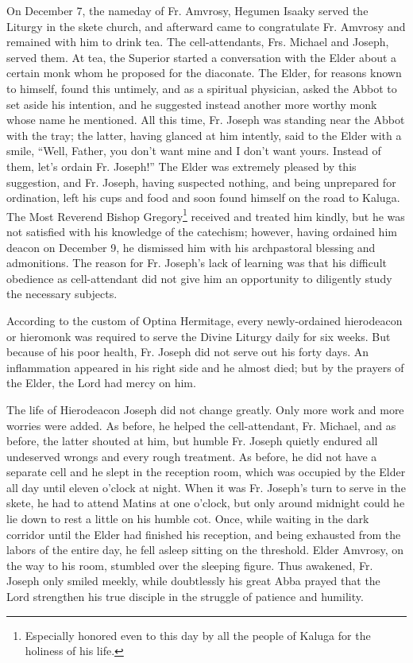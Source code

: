 On December 7, the nameday of Fr. Amvrosy, Hegumen Isaaky served the Liturgy in the skete church, and afterward came to congratulate Fr. Amvrosy and remained with him to drink tea. The cell-attendants, Frs. Michael and Joseph, served them. At tea, the Superior started a conversation with the Elder about a certain monk whom he proposed for the diaconate. The Elder, for reasons known to himself, found this untimely, and as a spiritual physician, asked the Abbot to set aside his intention, and he suggested instead another more worthy monk whose name he mentioned. All this time, Fr. Joseph was standing near the Abbot with the tray; the latter, having glanced at him intently, said to the Elder with a smile, “Well, Father, you don't want mine and I don't want yours. Instead of them, let's ordain Fr. Joseph!” The Elder was extremely pleased by this suggestion, and Fr. Joseph, having suspected nothing, and being unprepared for ordination, left his cups and food and soon found himself on the road to Kaluga. The Most Reverend Bishop Gregory\footnote{Especially honored even to this day by all the people of Kaluga for the holiness of his life.} received and treated him kindly, but he was not satisfied with his knowledge of the catechism; however, having ordained him deacon on December 9, he dismissed him with his archpastoral blessing and admonitions. The reason for Fr. Joseph's lack of learning was that his difficult obedience as cell-attendant did not give him an opportunity to diligently study the necessary subjects.

According to the custom of Optina Hermitage, every newly-ordained hierodeacon or hieromonk was required to serve the Divine Liturgy daily for six weeks. But because of his poor health, Fr. Joseph did not serve out his forty days. An inflammation appeared in his right side and he almost died; but by the prayers of the Elder, the Lord had mercy on him.

The life of Hierodeacon Joseph did not change greatly. Only more work and more worries were added. As before, he helped the cell-attendant, Fr. Michael, and as before, the latter shouted at him, but humble Fr. Joseph quietly endured all undeserved wrongs and every rough treatment. As before, he did not have a separate cell and he slept in the reception room, which was occupied by the Elder all day until eleven o'clock at night. When it was Fr. Joseph's turn to serve in the skete, he had to attend Matins at one o'clock, but only around midnight could he lie down to rest a little on his humble cot. Once, while waiting in the dark corridor until the Elder had finished his reception, and being exhausted from the labors of the entire day, he fell asleep sitting on the threshold. Elder Amvrosy, on the way to his room, stumbled over the sleeping figure. Thus awakened, Fr. Joseph only smiled meekly, while doubtlessly his great Abba prayed that the Lord strengthen his true disciple in the struggle of patience and humility.

